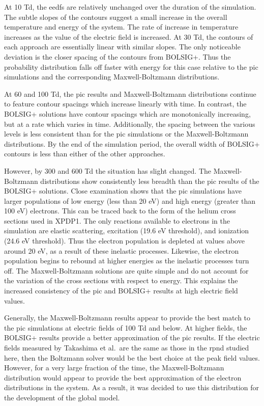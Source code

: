 At 10 Td, the \acs{eedf}s are relatively unchanged over the duration of the
simulation. The subtle slopes of the contours suggest a small increase in the
overall temperature and energy of the system. The rate of increase in
temperature increases as the value of the electric field is increased. At 30 Td,
the contours of each approach are essentially linear with similar slopes. The
only noticeable deviation is the closer spacing of the contours from BOLSIG+.
Thus the probability distribution falls off faster with energy for this case
relative to the \acs{pic} simulations and the corresponding Maxwell-Boltzmann
distributions.

At 60 and 100 Td, the \acs{pic} results and Maxwell-Boltzmann distributions
continue to feature contour spacings which increase linearly with time. In
contrast, the BOLSIG+ solutions have contour spacings which are monotonically
increasing, but at a rate which varies in time. Additionally, the spacing
between the various levels is less consistent than for the \acs{pic} simulations
or the Maxwell-Boltzmann distributions. By the end of the simulation period, the
overall width of BOLSIG+ contours is less than either of the other approaches.

However, by 300 and 600 Td the situation has slight changed. The
Maxwell-Boltzmann distributions show consistently less breadth than the
\acs{pic} results of the BOLSIG+ solutions. Close examination shows that the
\acs{pic} simulations have larger populations of low energy (less than 20 eV)
and high energy (greater than 100 eV) electrons. This can be traced back to the
form of the helium cross sections used in XPDP1. The only reactions available to
electrons in the simulation are elastic scattering, excitation (19.6 eV
threshold), and ionization (24.6 eV threshold). Thus the electron population is
depleted at values above around 20 eV, as a result of these inelastic processes.
Likewise, the electron population begins to rebound at higher energies as the
inelastic processes turn off. The Maxwell-Boltzmann solutions are quite simple
and do not account for the variation of the cross sections with respect to
energy. This explains the increased consistency of the \acs{pic} and BOLSIG+
results at high electric field values.

Generally, the Maxwell-Boltzmann results appear to provide the best match to the
\acs{pic} simulations at electric fields of 100 Td and below. At higher fields,
the BOLSIG+ results provide a better approximation of the \acs{pic} results.
If the electric fields measured by Takashima et al.\ are the same as those in the
\acs{rpnd} studied here, then the Boltzmann solver would be the best choice at
the peak field values. However, for a very large fraction of the time, the
Maxwell-Boltzmann distribution would appear to provide the best approximation of
the electron distributions in the system. As a result, it was decided to use
this distribution for the development of the global model.

